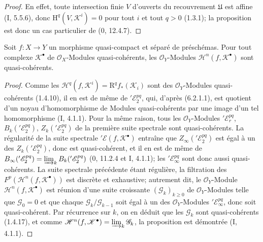 \begin{proof}
En effet, toute intersection finie $V$ d'ouverts du recouvrement
$\mathfrak U$ est affine (I, 5.5.6), donc
$\mathrm H^q(V,\mathscr K^i)=0$ pour tout $i$ et tout $q>0$ (1.3.1); la
proposition est donc un cas particulier de (0, 12.4.7).
\end{proof}

\begin{proposition}[6.2.3]
Soit $f:X\to Y$ un morphisme quasi-compact et séparé de préschémas. Pour tout
complexe $\mathscr K^\bullet$ de $\mathscr O_X$-Modules quasi-cohérents, les
$\mathscr O_Y$-Modules $\mathscr H^n(f,\mathscr K^\bullet)$ sont
quasi-cohérents.
\end{proposition}

\begin{proof}
Comme les $\mathscr H^q(f,\mathscr K^i)=\mathrm R^q f_*(\mathscr K_i)$ sont
des $\mathscr O_Y$-Modules quasi-cohérents (1.4.10), il en est de même de
$'\mathscr E_2^{pq}$, qui, d'après (6.2.1.1), est quotient d'un noyau
d'homomorphisme de Modules quasi-cohérents par une image d'un tel
homomorphisme (I, 4.1.1). Pour la même raison, tous les
$\mathscr O_Y$-Modules $'\mathscr E_r^{pq}$,
$B_k('\mathscr E_2^{pq})$, $Z_k('\mathscr E_2^{pq})$ de la première suite
spectrale sont quasi-cohérents. La régularité de la suite spectrale
$'\mathscr E(f,\mathscr K^\bullet)$ entraîne que
$Z_\infty('\mathscr E_2^{pq})$ est égal à un des
$Z_k('\mathscr E_2^{pq})$, donc est quasi-cohérent, et il en est de même de
$B_\infty('\mathscr E_2^{pq})=\varinjlim_k B_k('\mathscr E_2^{pq})$
(0, 11.2.4 et I, 4.1.1); les $'\mathscr E_\infty^{pq}$ sont donc aussi
quasi-cohérents. La suite spectrale précédente étant régulière, la filtration
des $F^p(\mathscr H^n(f,\mathscr K^\bullet))$ est discrète et exhaustive;
autrement dit, le $\mathscr O_Y$-Module
$\mathscr H^n(f,\mathscr K^\bullet)$ est réunion d'une suite croissante
$(\mathscr G_k)_{k\geq0}$ de $\mathscr O_Y$-Modules telle que
$\mathscr G_0=0$ et que chaque $\mathscr G_k/\mathscr G_{k-1}$ soit égal à un
des $\mathscr O_Y$-Modules $'\mathscr E_\infty^{pq}$, donc soit
quasi-cohérent. Par récurrence sur $k$, on en déduit que les $\mathscr G_k$
sont quasi-cohérents (1.4.17), et comme
$\mathscr H^n(f,\mathscr K^\bullet)=\varinjlim_k\mathscr G_k$, la proposition
est démontrée (I, 4.1.1).
\end{proof}

